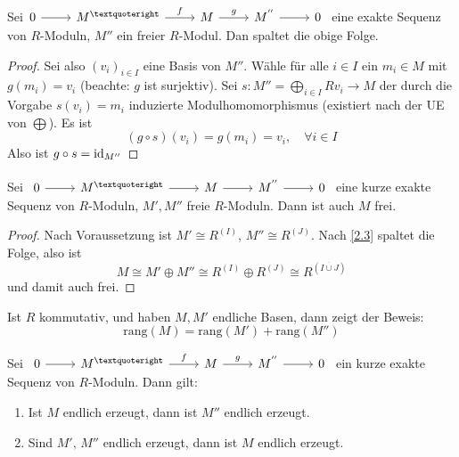 \begin{sa}\label{2.3}
	Sei$\begin{tikzcd}
	0  \arrow{r} & M^{’} \arrow{r}{f} & M \arrow{r}{g} & M^{''} \arrow{r} & 0
	\end{tikzcd} $ eine exakte Sequenz von $R$-Moduln, $M''$ ein freier $R$-Modul. Dan spaltet die obige Folge.
\end{sa}
\begin{proof}
	Sei also $(v_i)_{i\in I}$ eine Basis von $M''$. Wähle für alle $i\in I$ ein $m_i\in M$ mit $g(m_i) = v_i$ (beachte: $g$ ist surjektiv). Sei $s:M'' = \bigoplus_{i\in I} Rv_i \to M$ der durch die Vorgabe $s(v_i) = m_i$ induzierte Modulhomomorphismus (existiert nach der UE von $\bigoplus$). Es ist 
	$$(g\circ s) (v_i) = g(m_i) = v_i, \quad \forall i\in I$$
	Also ist $g\circ s = \operatorname{id}_{M''}$
\end{proof}
\begin{fo}\label{2.4}
	Sei $\begin{tikzcd}
	0  \arrow{r} & M^{’} \arrow{r} & M \arrow{r} & M^{''} \arrow{r} & 0
	\end{tikzcd} $ eine kurze exakte Sequenz von $R$-Moduln, $M', M''$ freie $R$-Moduln. Dann ist auch $M$ frei.
\end{fo}
\begin{proof}
	Nach Voraussetzung ist $M' \cong R^{(I)}$, $M'' \cong R^{(J)}$. Nach \ref{2.3} spaltet die Folge, also ist 
	$$M  \cong M'\oplus M'' \cong R^{(I)} \oplus R^{(J)} \cong R^{(I \overset{\cdot}{\cup} J)}$$ und damit auch frei.
\end{proof}
\begin{anm}
	Ist $R$ kommutativ, und haben $M,M'$ endliche Basen, dann zeigt der Beweis: 
	$$\text{rang}(M) = \text{rang}(M') + \text{rang}(M'')$$
\end{anm}
\begin{bem}\label{2.5}
	Sei $\begin{tikzcd}
	0  \arrow{r} & M^{’} \arrow{r}{f} & M \arrow{r}{g} & M^{''} \arrow{r} & 0
	\end{tikzcd} $ ein kurze exakte Sequenz von $R$-Moduln. Dann gilt: 
	\begin{enumerate}[label= \alph*)]
		\item Ist $M$ endlich erzeugt, dann ist $M''$ endlich erzeugt.
		\item Sind $M', \, M''$ endlich erzeugt, dann ist $M$ endlich erzeugt.
	\end{enumerate}
\end{bem}
